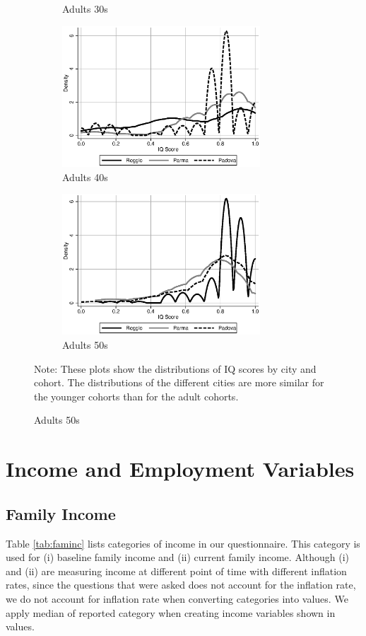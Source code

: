 \begin{figure}[H]
\begin{center}
\begin{subfigure}{.5\textwidth}
		\caption{Adults 30s}
	\end{subfigure}
	\begin{subfigure}{.5\textwidth}
		\centering
		\includegraphics[width=20em]{../../../../Output/IQ_score_5}
		\caption{Adults 40s}
	\end{subfigure}%
	\begin{subfigure}{.5\textwidth}
		\centering
		\includegraphics[width=20em]{../../../../Output/IQ_score_6}
		\caption{Adults 50s}
	\end{subfigure}
\end{center}
\raggedright \footnotesize
Note: These plots show the distributions of IQ scores by city and cohort. The distributions of the different cities are more similar for the younger cohorts than for the adult cohorts. 
\end{figure}


\section{Income and Employment Variables}
\label{sec:income}
\subsection{Family Income}

Table \ref{tab:faminc} lists categories of income in our questionnaire. This category is used for (i) baseline family income and (ii) current family income. Although (i) and (ii) are measuring income at different point of time with different inflation rates, since the questions that were asked does not account for the inflation rate, we do not account for inflation rate when converting categories into values. We apply median of reported category when creating income variables shown in values. 


